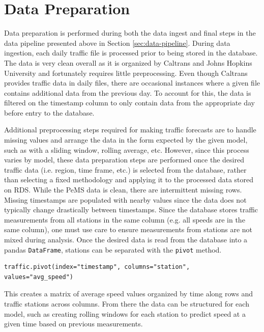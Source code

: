 \documentclass{article}
\begin{document}
\section{Data Preparation}
\label{sec:data-prep}

Data preparation is performed during both the data ingest and final steps in the data pipeline presented above in Section \ref{sec:data-pipeline}. During data ingestion, each daily traffic file is processed prior to being stored in the database. The data is very clean overall as it is organized by Caltrans and Johns Hopkins University and fortunately requires little preprocessing. Even though Caltrans provides traffic data in daily files, there are occasional instances where a given file contains additional data from the previous day. To account for this, the data is filtered on the timestamp column to only contain data from the appropriate day before entry to the database.

Additional preprocessing steps required for making traffic forecasts are to handle missing values and arrange the data in the form expected by the given model, such as with a sliding window, rolling average, etc. However, since this process varies by model, these data preparation steps are performed once the desired traffic data (i.e. region, time frame, etc.) is selected from the database, rather than selecting a fixed methodology and applying it to the processed data stored on RDS. While the PeMS data is clean, there are intermittent missing rows. Missing timestamps are populated with nearby values since the data does not typically change drastically between timestamps. Since the database stores traffic measurements from all stations in the same column (e.g. all speeds are in the same column), one must use care to ensure measurements from stations are not mixed during analysis. Once the desired data is read from the database into a pandas \texttt{DataFrame}, stations can be separated with the \texttt{pivot} method.

\begin{verbatim}
traffic.pivot(index="timestamp", columns="station", values="avg_speed")
\end{verbatim}

This creates a matrix of average speed values organized by time along rows and traffic stations across columns. From there the data can be structured for each model, such as creating rolling windows for each station to predict speed at a given time based on previous measurements.
\end{document}
